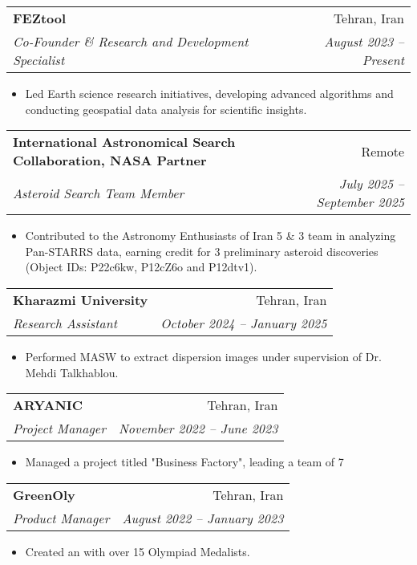 \documentclass[letterpaper,11pt]{article}
\makeatletter
\newcommand{\resitem}[1]{\item #1 \vspace{-2pt}}
\newcommand{\ressubheading}[4]{%
	\begin{tabular*}{\textwidth}{l@{\cftdotfill{\cftsecdotsep}\extracolsep{\fill}}r}
		\textbf{#1} & #2 \\
		\textit{#3} & \textit{#4} \\
	\end{tabular*}\vspace{-8pt}
}
\makeatother
\begin{document}
		\vspace{-0.78em} 
		\ressubheading{FEZtool}{Tehran, Iran}{Co-Founder \& Research and Development Specialist}{August 2023 – Present}
		\begin{itemize}[topsep=7.5pt,partopsep=0pt,itemsep=3.5pt,parsep=0pt]
			\resitem{Led Earth science research initiatives, developing advanced algorithms and conducting geospatial data analysis for scientific insights.}
			
		\end{itemize}
		\vspace{-0.50em}
		\ressubheading{International Astronomical Search Collaboration, NASA Partner}{Remote}{Asteroid Search Team Member}{July 2025 – September 2025}
		\begin{itemize}[topsep=7.5pt,partopsep=0pt,itemsep=3.5pt,parsep=0pt]
			\resitem{Contributed to the Astronomy Enthusiasts of Iran 5 \& 3 team in analyzing Pan-STARRS data, earning credit for 3 preliminary asteroid discoveries (Object IDs: P22c6kw, P12cZ6o and P12dtv1).}
		\end{itemize}
		\vspace{-0.50em}  
		\ressubheading{Kharazmi University}{Tehran, Iran}{Research Assistant}{October 2024 – January 2025}
		\begin{itemize}[topsep=7.5pt,partopsep=0pt,itemsep=3.5pt,parsep=0pt]
			\resitem{Performed MASW to extract dispersion images under supervision of Dr. Mehdi Talkhablou.}
		\end{itemize}
		\vspace{-0.50em} 
		\ressubheading{ARYANIC}{Tehran, Iran}{Project Manager}{November 2022 – June 2023}
		\begin{itemize}[topsep=7.5pt,partopsep=0pt,itemsep=3.5pt,parsep=0pt]
			\resitem{Managed a project titled "Business Factory", leading a team of 7}
		\end{itemize}
		\vspace{-0.50em} 
		\ressubheading{GreenOly}{Tehran, Iran}{Product Manager}{August 2022 – January 2023}
		\begin{itemize}[topsep=7.5pt,partopsep=0pt,itemsep=3.5pt,parsep=0pt]
			\resitem{Created an
				\href{https://aradfarahani.com/MOOC/}{\dotuline{Entrepreneurship MOOC}} with over 15 Olympiad Medalists.}
			
		\end{itemize}
		\vspace{+1.1em} 
		
		
\end{document}
